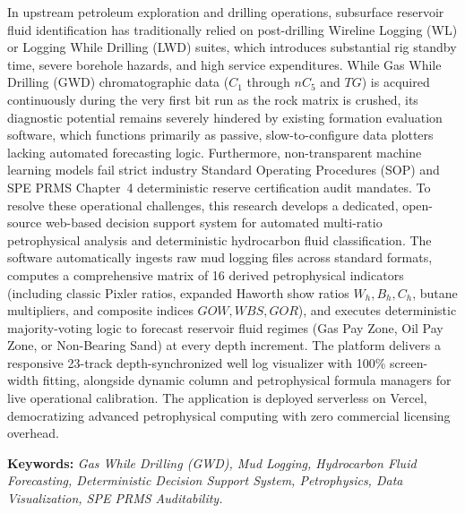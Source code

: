 \begin{abstracteng}
In upstream petroleum exploration and drilling operations, subsurface reservoir fluid identification has traditionally relied on post-drilling Wireline Logging (WL) or Logging While Drilling (LWD) suites, which introduces substantial rig standby time, severe borehole hazards, and high service expenditures. While Gas While Drilling (GWD) chromatographic data ($C_1$ through $nC_5$ and $TG$) is acquired continuously during the very first bit run as the rock matrix is crushed, its diagnostic potential remains severely hindered by existing formation evaluation software, which functions primarily as passive, slow-to-configure data plotters lacking automated forecasting logic. Furthermore, non-transparent machine learning models fail strict industry Standard Operating Procedures (SOP) and SPE PRMS Chapter~4 deterministic reserve certification audit mandates. To resolve these operational challenges, this research develops a dedicated, open-source web-based decision support system for automated multi-ratio petrophysical analysis and deterministic hydrocarbon fluid classification. The software automatically ingests raw mud logging files across standard formats, computes a comprehensive matrix of 16 derived petrophysical indicators (including classic Pixler ratios, expanded Haworth show ratios $W_h, B_h, C_h$, butane multipliers, and composite indices $GOW, WBS, GOR$), and executes deterministic majority-voting logic to forecast reservoir fluid regimes (Gas Pay Zone, Oil Pay Zone, or Non-Bearing Sand) at every depth increment. The platform delivers a responsive 23-track depth-synchronized well log visualizer with 100\% screen-width fitting, alongside dynamic column and petrophysical formula managers for live operational calibration. The application is deployed serverless on Vercel, democratizing advanced petrophysical computing with zero commercial licensing overhead.

\bigskip
\noindent\textbf{Keywords:} \textit{Gas While Drilling (GWD), Mud Logging, Hydrocarbon Fluid Forecasting, Deterministic Decision Support System, Petrophysics, Data Visualization, SPE PRMS Auditability.}
\end{abstracteng}
